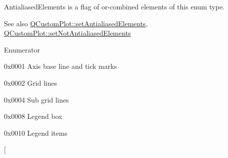 {\ttfamily Antialiased\+Elements} is a flag of or-\/combined elements of this enum type.

\begin{DoxySeeAlso}{See also}
\hyperlink{classQCustomPlot_af6f91e5eab1be85f67c556e98c3745e8}{Q\+Custom\+Plot\+::set\+Antialiased\+Elements}, \hyperlink{classQCustomPlot_ae10d685b5eabea2999fb8775ca173c24}{Q\+Custom\+Plot\+::set\+Not\+Antialiased\+Elements} 
\end{DoxySeeAlso}
\begin{Desc}
\item[Enumerator]\par
\begin{description}
\item[{\em 
ae\+Axes\hypertarget{namespaceQCP_ae55dbe315d41fe80f29ba88100843a0caefa92e89cd37f8a081fd2075aa1af73f}{}\label{namespaceQCP_ae55dbe315d41fe80f29ba88100843a0caefa92e89cd37f8a081fd2075aa1af73f}
}]{\ttfamily 0x0001} Axis base line and tick marks \item[{\em 
ae\+Grid\hypertarget{namespaceQCP_ae55dbe315d41fe80f29ba88100843a0ca4fbb37118d62288af0ca601ff2b07a2f}{}\label{namespaceQCP_ae55dbe315d41fe80f29ba88100843a0ca4fbb37118d62288af0ca601ff2b07a2f}
}]{\ttfamily 0x0002} Grid lines \item[{\em 
ae\+Sub\+Grid\hypertarget{namespaceQCP_ae55dbe315d41fe80f29ba88100843a0caaedf83369188a15a69f92bb1d85ca97b}{}\label{namespaceQCP_ae55dbe315d41fe80f29ba88100843a0caaedf83369188a15a69f92bb1d85ca97b}
}]{\ttfamily 0x0004} Sub grid lines \item[{\em 
ae\+Legend\hypertarget{namespaceQCP_ae55dbe315d41fe80f29ba88100843a0ca9e0127a6361b5d0596b031a482c5cf97}{}\label{namespaceQCP_ae55dbe315d41fe80f29ba88100843a0ca9e0127a6361b5d0596b031a482c5cf97}
}]{\ttfamily 0x0008} Legend box \item[{\em 
ae\+Legend\+Items\hypertarget{namespaceQCP_ae55dbe315d41fe80f29ba88100843a0ca1aca7a50c1b95403958733a4acafe773}{}\label{namespaceQCP_ae55dbe315d41fe80f29ba88100843a0ca1aca7a50c1b95403958733a4acafe773}
}]{\ttfamily 0x0010} Legend items \item[{\em 
}
\end{description}
\end{Desc}
